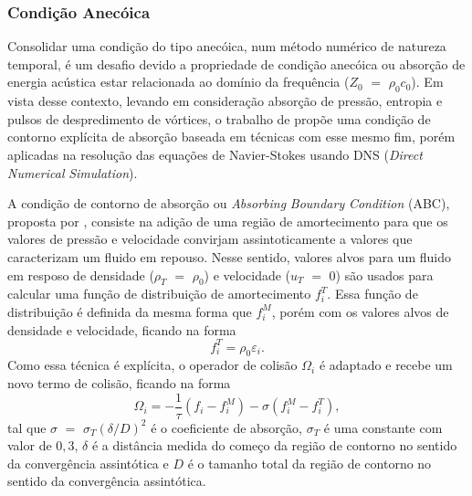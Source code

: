 \subsubsection{Condição Anecóica}

Consolidar uma condição do tipo anecóica, num método numérico de natureza temporal, é um desafio devido a propriedade de condição anecóica ou absorção de energia acústica estar relacionada ao domínio da frequência ($Z_{0}$ $=$ $\rho_{0}c_{0}$). Em vista desse contexto, levando em consideração absorção de pressão, entropia e pulsos de despredimento de vórtices, o trabalho de  propõe uma condição de contorno explícita de absorção baseada em técnicas com esse mesmo fim, porém aplicadas na resolução das equações de Navier-Stokes usando DNS (\textit{Direct} \textit{Numerical} \textit{Simulation}).

A condição de contorno de absorção ou \textit{Absorbing} \textit{Boundary} \textit{Condition} (ABC), proposta por , consiste na adição de uma região de amortecimento para que os valores de pressão e velocidade convirjam assintoticamente a valores que caracterizam um fluido em repouso. Nesse sentido, valores alvos para um fluido em resposo de densidade ($\rho_{T}$ $=$ $\rho_{0}$) e velocidade (\textbf{$u_{T}$} $=$ $0$) são usados para calcular uma função de distribuição de amortecimento $f_{i}^{T}$. Essa função de distribuição é definida da mesma forma que $f_{i}^{M}$, porém com os valores alvos de densidade e velocidade, ficando na forma
\begin{equation}
  f_{i}^{T} = \rho_{0}\varepsilon_{i}.
  \label{eq:f_alvo}
\end{equation}
Como essa técnica é explícita, o operador de colisão $\Omega_{i}$ é adaptado e recebe um novo termo de colisão, ficando na forma
\begin{equation}
  \Omega_{i} = -\frac{1}{\tau}(f_{i} - f_{i}^{M}) - \sigma(f_{i}^{M} - f_{i}^{T}),
  \label{eq:omega_i_abc}
\end{equation}
tal que $\sigma$ $=$ $\sigma_{T}(\delta/D)^{2}$ é o coeficiente de absorção, $\sigma_{T}$ é uma constante com valor de $0,3$, $\delta$ é a distância medida do começo da região de contorno no sentido da convergência assintótica e $D$ é o tamanho total da região de contorno no sentido da convergência assintótica.

